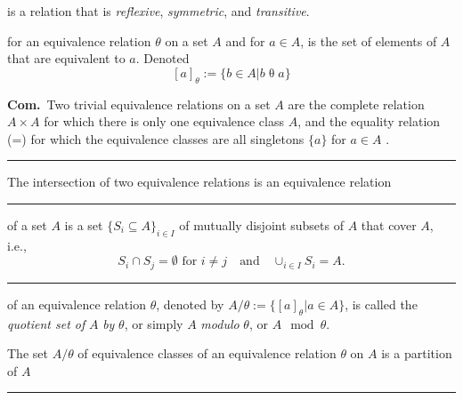 \documentclass[a4paper]{extarticle}
\newcommand{\Com}{\textbf{Com.}\ }
\newcommand{\Z}{\mathbb{Z}}
\newcommand{\Q}{\mathbb{Q}}
\newcommand{\reltheta}{\mathrel{\theta}}
\newcommand{\relsim}{\mathrel{\sim}}
\newcommand{\sep}{\vspace{5pt}\noindent\hrule\vspace{5pt}}
\begin{document}
\begin{multicols*}{2}
 is a relation that is \emph{reflexive},
\emph{symmetric}, and \emph{transitive}.

 for an equivalence relation $\theta$ on a set $A$ and
for $a\in A$, is the set of elements of $A$ that are equivalent to $a$. Denoted
\[
[a]_\theta := \{b\in A|b\reltheta a\}
\]

\Com Two trivial equivalence relations on a set $A$ are the complete relation
$A\times A$ for which there is only one equivalence class $A$, and the equality
relation (=) for which the equivalence classes are all singletons $\{a\}$ for
$a\in A$ .

\sep

\Lem The intersection of two equivalence relations is an equivalence relation

\sep

\Def[Partition] of a set $A$ is a set $\{S_i \subseteq
A\}_{i\in I}$ of mutually disjoint subsets of $A$ that cover $A$, i.e.,
\[
S_i \cap S_j = \emptyset \text{ for } i\neq j \quad \text{and} \quad
\cup_{i\in I}S_i=A. 
\]

\sep

 of an equivalence relation $\theta$, denoted by
$A/\theta:=\{[a]_\theta|a\in A\}$, is called the \emph{quotient set of} $A$
\emph{by} $\theta$, or simply $A$ \emph{modulo} $\theta$, or $A\mod \theta$.

\Thm The set $A/\theta$ of equivalence classes of an equivalence relation
$\theta$ on $A$ is a partition of $A$

\sep

\end{multicols*}
\end{document}
